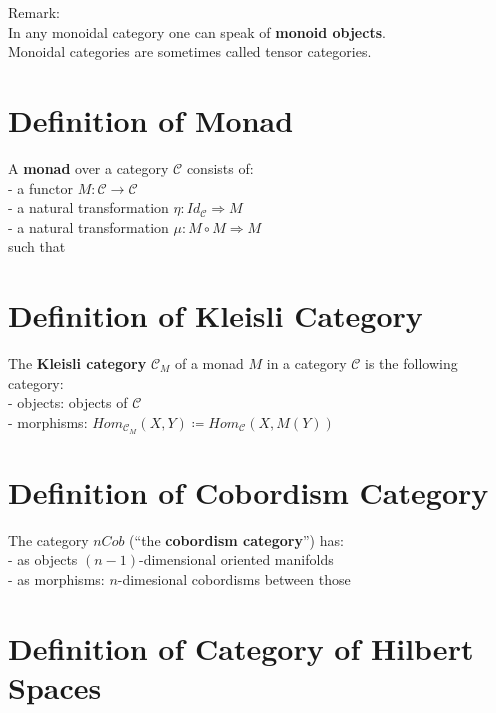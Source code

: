 \documentclass[a4paper, twoside, english, 11pt]{book}
\newcommand{\C}{\mathcal C}
\begin{document}
\noindent
Remark: \\
In any monoidal category one can speak of \textbf{monoid objects}. \\

\noindent
Monoidal categories are sometimes called tensor categories.



\section{Definition of Monad}

A \textbf{monad} over a category $\C$ consists of: \\

- a functor $M : \C \rightarrow \C$ \\

- a natural transformation $\eta : Id_\C \Rightarrow M$ \\

- a natural transformation $\mu : M \circ M \Rightarrow M$ \\

such that %



\section{Definition of Kleisli Category}

The \textbf{Kleisli category} $\C_M$ of a monad $M$ in a category $\C$ is the following category: \\

- objects: objects of $\C$ \\

- morphisms: $Hom_{\C_M}(X, Y) \coloneqq Hom_\C(X, M(Y))$



\section{Definition of Cobordism Category}

The category $nCob$ (``the \textbf{cobordism category}'') has: \\

- as objects $(n - 1)$-dimensional oriented manifolds \\

- as morphisms: $n$-dimesional cobordisms between those



\section{Definition of Category of Hilbert Spaces}
\end{document}
